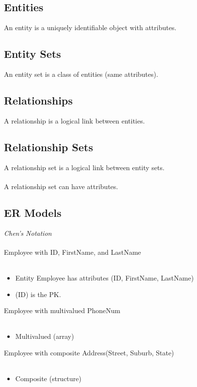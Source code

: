 \documentclass[11pt, a4paper]{article}
\begin{document}
    \subsection{Entities}
    An entity is a uniquely identifiable object with attributes. 

    \subsection{Entity Sets}
    An entity set is a class of entities (same attributes). 

    \subsection{Relationships}
    A relationship is a logical link between entities. 

    \subsection{Relationship Sets}
    A relationship set is a logical link between entity sets. \\\\
    A relationship set can have attributes. 

    \subsection{ER Models}
    \emph{Chen's Notation} \\\\ 

    Employee with ID, FirstName, and LastName \\\\ 
    \begin{itemize}
        \item Entity Employee has attributes (ID, FirstName, LastName) 
        \item (ID) is the PK. 
    \end{itemize}

    Employee with multivalued PhoneNum \\\\ 
    \begin{itemize}
        \item Multivalued (array) 
    \end{itemize}

    Employee with composite Address(Street, Suburb, State) \\\\ 
    \begin{itemize}
        \item Composite (structure) 
    \end{itemize}
\end{document}
